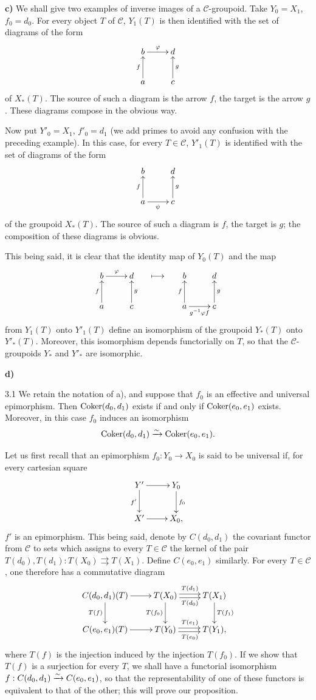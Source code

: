 \textbf{c)} We shall give two examples of inverse images of a $\mathcal C$-groupoid. Take $Y_0=X_1$, $f_0=d_0$. For every object $T$ of $\mathcal C$, $Y_1(T)$ is then identified with the set of diagrams of the form
\[
\xymatrix{b\ar[r]^\varphi&d\\a\ar[u]^f&c\ar[u]_g}
\]
of $X_*(T)$. The source of such a diagram is the arrow $f$, the target is the arrow $g$. These diagrams compose in the obvious way.

Now put $Y'_0=X_1$, $f'_0=d_1$ (we add primes to avoid any confusion with the preceding example). In this case, for every $T\in\mathcal C$, $Y'_1(T)$ is identified with the set of diagrams of the form
\[
\xymatrix{b&d\\a\ar[u]^f\ar[r]_\psi&c\ar[u]_g}
\]
of the groupoid $X_*(T)$. The source of such a diagram is $f$, the target is $g$; the composition of these diagrams is obvious.

This being said, it is clear that the identity map of $Y_0(T)$ and the map
\[
\xymatrix{b\ar[r]^\varphi&d\\a\ar[u]^f&c\ar[u]_g}
\quad\longmapsto\quad
\xymatrix{b&d\\a\ar[u]^f\ar[r]_{g^{-1}\varphi f}&c\ar[u]_g}
\]
from $Y_1(T)$ onto $Y'_1(T)$ define an isomorphism of the groupoid $Y_*(T)$ onto $Y'_*(T)$. Moreover, this isomorphism depends functorially on $T$, so that the $\mathcal C$-groupoids $Y_*$ and $Y'_*$ are isomorphic.

\textbf{d)}
\begin{proposition}{3.1}\label{V.3.1}
We retain the notation of a), and suppose that $f_0$ is an effective and universal epimorphism. Then $\operatorname{Coker}(d_0,d_1)$ exists if and only if $\operatorname{Coker}(e_0,e_1)$ exists. Moreover, in this case $f_0$ induces an isomorphism
\[
\operatorname{Coker}(d_0,d_1)\xrightarrow{\sim}\operatorname{Coker}(e_0,e_1).
\]
\end{proposition}
Let us first recall that an epimorphism $f_0:Y_0\to X_0$ is said to be universal if, for every cartesian square
\[
\xymatrix{Y'\ar[r]\ar[d]_{f'}&Y_0\ar[d]^{f_0}\\X'\ar[r]&X_0,}
\]
$f'$ is an epimorphism. This being said, denote by $C(d_0,d_1)$ the covariant functor from $\mathcal C$ to sets which assigns to every $T\in\mathcal C$ the kernel of the pair $T(d_0),T(d_1):T(X_0)\rightrightarrows T(X_1)$. Define $C(e_0,e_1)$ similarly. For every $T\in\mathcal C$, one therefore has a commutative diagram
\[
\xymatrix{C(d_0,d_1)(T)\ar[r]\ar[d]_{T(f)}&T(X_0)\ar@<.5ex>[r]^{T(d_1)}\ar@<-.5ex>[r]_{T(d_0)}\ar[d]_{T(f_0)}&T(X_1)\ar[d]^{T(f_1)}\\C(e_0,e_1)(T)\ar[r]&T(Y_0)\ar@<.5ex>[r]^{T(e_1)}\ar@<-.5ex>[r]_{T(e_0)}&T(Y_1),}
\]
where $T(f)$ is the injection induced by the injection $T(f_0)$. If we show that $T(f)$ is a surjection for every $T$, we shall have a functorial isomorphism $f:C(d_0,d_1)\xrightarrow{\sim} C(e_0,e_1)$, so that the representability of one of these functors is equivalent to that of the other; this will prove our proposition.

